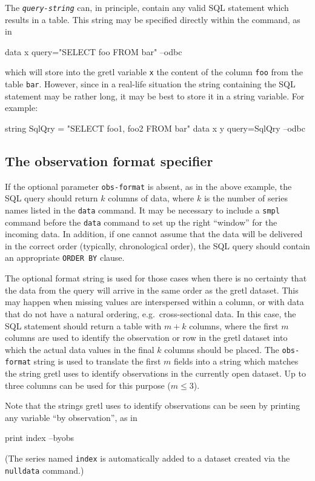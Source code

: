The \texttt{\emph{query-string}} can, in principle, contain any valid
SQL statement which results in a table. This string may be specified
directly within the command, as in
\begin{code}
  data x query="SELECT foo FROM bar" --odbc
\end{code}
which will store into the gretl variable \texttt{x} the content of the
column \texttt{foo} from the table \texttt{bar}. However, since in a
real-life situation the string containing the SQL statement may be
rather long, it may be best to store it in a string variable.  For
example:
\begin{code}
  string SqlQry = "SELECT foo1, foo2 FROM bar"
  data x y query=SqlQry --odbc
\end{code}

\subsection{The observation format specifier}

If the optional parameter \texttt{obs-format} is absent, as in the
above example, the SQL query should return $k$ columns of data, where
$k$ is the number of series names listed in the \texttt{data} command.
It may be necessary to include a \texttt{smpl} command before the
\texttt{data} command to set up the right ``window'' for the incoming
data.  In addition, if one cannot assume that the data will be
delivered in the correct order (typically, chronological order), the
SQL query should contain an appropriate \texttt{ORDER BY} clause.

The optional format string is used for those cases when there is no
certainty that the data from the query will arrive in the same order
as the gretl dataset. This may happen when missing values are
interspersed within a column, or with data that do not have a natural
ordering, e.g.\ cross-sectional data. In this case, the SQL statement
should return a table with $m+k$ columns, where the first $m$
columns are used to identify the observation or row in the gretl
dataset into which the actual data values in the final $k$ columns
should be placed.  The \texttt{obs-format} string is used to translate
the first $m$ fields into a string which matches the string
gretl uses to identify observations in the currently open
dataset. Up to three columns can be used for this purpose ($m \leq
3$).

Note that the strings gretl uses to identify observations
can be seen by printing any variable ``by observation'', as in
%
\begin{code}
print index --byobs
\end{code}
%
(The series named \texttt{index} is automatically added to a dataset
created via the \texttt{nulldata} command.)

